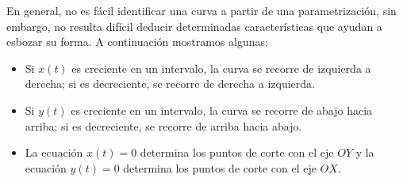 En general, no es fácil identificar una curva a partir de una parametrización,
sin embargo, no resulta difícil deducir determinadas características que ayudan a esbozar su forma.
A continuación mostramos algunas:
\begin{itemize}
\item
Si $x(t)$ es creciente en un intervalo, la curva se recorre de izquierda a derecha; si es decreciente, se recorre de derecha a izquierda.
\item
Si $y(t)$ es creciente en un intervalo, la curva se recorre de abajo hacia arriba; si es decreciente, se recorre de arriba hacia abajo.
\item
La ecuación $x(t)=0$ determina los puntos de corte con el eje $OY$ y la ecuación $y(t)=0$ determina los puntos de corte con el eje $OX$.
\end{itemize}
%

